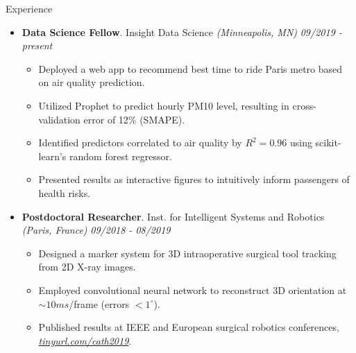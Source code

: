 \documentclass{resume} %
\begin{document}
\begin{rSection}{Experience}
	
	\begin{itemize}[leftmargin=0em]
	\item {\bf Data Science Fellow}{. Insight Data Science \textit{(Minneapolis, MN)}} \hfill {\em 09/2019 - present}\\
	\vspace{-5mm}
	\begin{itemize}
		\setlength\itemsep{-1.75em}
		\item Deployed a web app to recommend best time to ride Paris metro based on air quality prediction.\\
		\item Utilized Prophet to predict hourly PM10 level, resulting in cross-validation error of 12\% (SMAPE).\\
		\item Identified predictors correlated to air quality by $R^2 = 0.96$ using scikit-learn's random forest regressor.\\
		\item Presented results as interactive figures to intuitively inform passengers of health risks.
	\end{itemize}	
	
	\item {\bf Postdoctoral Researcher}{. Inst. for Intelligent Systems and Robotics \textit{(Paris, France)}} \hfill {\em 09/2018 - 08/2019}\\
	\vspace{-5mm}
	\begin{itemize}
		\setlength\itemsep{-1.75em}
		\item  Designed a marker system for 3D intraoperative surgical tool tracking from 2D X-ray images.\\ 
		\item  Employed convolutional neural network to reconstruct 3D orientation at $\sim 10 ms$/frame (errors $< 1 ^\circ$).\\
		\item  Published results at IEEE and European surgical robotics conferences, \textit{\href{tinyurl.com/cath2019}{tinyurl.com/cath2019}}.
	\end{itemize}
	

\end{itemize}
\end{rSection}
\end{document}

